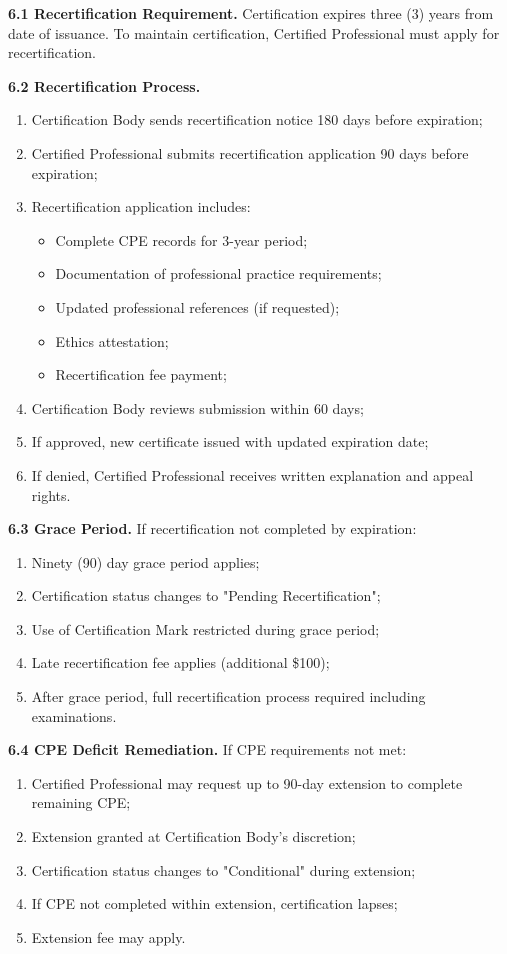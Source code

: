 \documentclass[11pt,a4paper]{article}
\begin{document}
\textbf{6.1 Recertification Requirement.} Certification expires three (3) years from date of issuance. To maintain certification, Certified Professional must apply for recertification.

\textbf{6.2 Recertification Process.}

\begin{enumerate}[label=\alph*)]
\item Certification Body sends recertification notice 180 days before expiration;
\item Certified Professional submits recertification application 90 days before expiration;
\item Recertification application includes:
\begin{itemize}
\item Complete CPE records for 3-year period;
\item Documentation of professional practice requirements;
\item Updated professional references (if requested);
\item Ethics attestation;
\item Recertification fee payment;
\end{itemize}
\item Certification Body reviews submission within 60 days;
\item If approved, new certificate issued with updated expiration date;
\item If denied, Certified Professional receives written explanation and appeal rights.
\end{enumerate}

\textbf{6.3 Grace Period.} If recertification not completed by expiration:

\begin{enumerate}[label=\alph*)]
\item Ninety (90) day grace period applies;
\item Certification status changes to "Pending Recertification";
\item Use of Certification Mark restricted during grace period;
\item Late recertification fee applies (additional \$100);
\item After grace period, full recertification process required including examinations.
\end{enumerate}

\textbf{6.4 CPE Deficit Remediation.} If CPE requirements not met:

\begin{enumerate}[label=\alph*)]
\item Certified Professional may request up to 90-day extension to complete remaining CPE;
\item Extension granted at Certification Body's discretion;
\item Certification status changes to "Conditional" during extension;
\item If CPE not completed within extension, certification lapses;
\item Extension fee may apply.
\end{enumerate}
\end{document}
